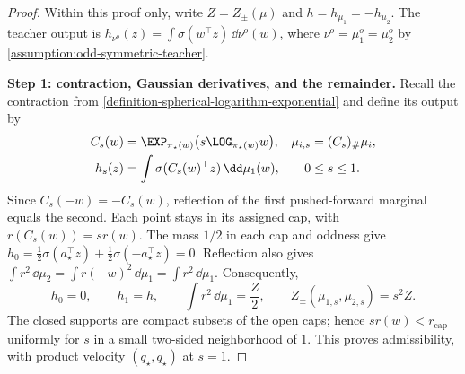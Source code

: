 \begin{proof}
Within this proof only, write \(Z=Z_\pm(\mu)\) and
\(h=h_{\mu_1}=-h_{\mu_2}\). The teacher output is
\(h_{\nu^o}(z)=\int\sigma(w^\top z)\,\dd\nu^o(w)\), where
\(\nu^o=\mu_1^o=\mu_2^o\) by \cref{assumption:odd-symmetric-teacher}.

\par\noindent\textbf{Step 1: contraction, Gaussian derivatives, and the remainder.}
Recall the contraction from \cref{definition-spherical-logarithm-exponential}
and define its output by
\begin{equation}
\label{eq:mf-pole-contraction-path}
\begin{aligned}
 C_s(w)&=\EXP_{\pi_\star(w)}\bigl(s\LOG_{\pi_\star(w)}w\bigr),
 &\mu_{i,s}&=(C_s)_\#\mu_i,\\
 h_s(z)&=\int\sigma(C_s(w)^\top z)\,\dd\mu_1(w),
 &0&\le s\le1.
\end{aligned}
\end{equation}
Since \(C_s(-w)=-C_s(w)\), reflection of the first pushed-forward
marginal equals the second. Each point stays in its assigned cap, with
\(r(C_s(w))=s r(w)\). The mass \(1/2\) in each cap and oddness give
\(h_0=\tfrac12\sigma(a_\star^\top z)+
\tfrac12\sigma(-a_\star^\top z)=0\). Reflection also gives
\(\int r^2\,\dd\mu_2=\int r(-w)^2\,\dd\mu_1=\int r^2\,\dd\mu_1\).
Consequently,
\begin{equation}
\label{eq:mf-contraction-endpoint-identities}
 h_0=0,\qquad h_1=h,\qquad
 \int r^2\,\dd\mu_1=\frac Z2,\qquad
 Z_\pm(\mu_{1,s},\mu_{2,s})=s^2Z.
\end{equation}
The closed supports are compact subsets of the open caps; hence
\(s r(w)<r_{\mathrm{cap}}\) uniformly for \(s\) in a small two-sided
neighborhood of \(1\). This proves admissibility, with product velocity
\((q_\star,q_\star)\) at \(s=1\).


\end{proof}
